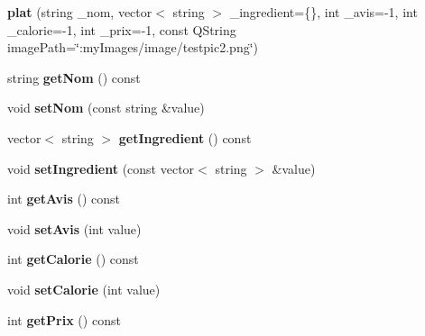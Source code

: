 \begin{DoxyCompactItemize}
\item 
{\bfseries plat} (string \+\_\+nom, vector$<$ string $>$ \+\_\+ingredient=\{\}, int \+\_\+avis=-\/1, int \+\_\+calorie=-\/1, int \+\_\+prix=-\/1, const Q\+String image\+Path=\char`\"{}\+:my\+Images/image/testpic2.\+png\char`\"{})\hypertarget{classplat_a1d7b99afbf5d26ce34478012782265ee}{}\label{classplat_a1d7b99afbf5d26ce34478012782265ee}

\item 
string {\bfseries get\+Nom} () const \hypertarget{classplat_a172b4fa5c6bb8353e393205be28a2a3d}{}\label{classplat_a172b4fa5c6bb8353e393205be28a2a3d}

\item 
void {\bfseries set\+Nom} (const string \&value)\hypertarget{classplat_a28a571789cdb478907d31f572454bd4a}{}\label{classplat_a28a571789cdb478907d31f572454bd4a}

\item 
vector$<$ string $>$ {\bfseries get\+Ingredient} () const \hypertarget{classplat_aa86ce997d1672e9786d1a52647cf82a0}{}\label{classplat_aa86ce997d1672e9786d1a52647cf82a0}

\item 
void {\bfseries set\+Ingredient} (const vector$<$ string $>$ \&value)\hypertarget{classplat_a99fc4f43099e6e798541c7ad950afa27}{}\label{classplat_a99fc4f43099e6e798541c7ad950afa27}

\item 
int {\bfseries get\+Avis} () const \hypertarget{classplat_a95882ac8b6748992bc5657efa4059a20}{}\label{classplat_a95882ac8b6748992bc5657efa4059a20}

\item 
void {\bfseries set\+Avis} (int value)\hypertarget{classplat_a184976424abe4e9b8821b801bdac2e64}{}\label{classplat_a184976424abe4e9b8821b801bdac2e64}

\item 
int {\bfseries get\+Calorie} () const \hypertarget{classplat_a2bea33308a19317150126b8a5258afcb}{}\label{classplat_a2bea33308a19317150126b8a5258afcb}

\item 
void {\bfseries set\+Calorie} (int value)\hypertarget{classplat_a3950a6fa28af22b321046da35e507e5a}{}\label{classplat_a3950a6fa28af22b321046da35e507e5a}

\item 
int {\bfseries get\+Prix} () const \hypertarget{classplat_a012fa79385654ae6af325d3837b67e45}{}\label{classplat_a012fa79385654ae6af325d3837b67e45}


\end{DoxyCompactItemize}
